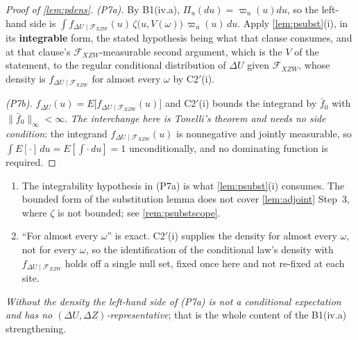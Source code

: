 \begin{proof}[Proof of \cref{lem:pdens}]
\emph{\textup{(P7a)}.} By B1(iv.a), $\Pi_u(du)=\varpi_u(u)du$, so the left-hand side is
$\int f_{\Delta U\mid\mathcal F_{XZW}}(u)\,\zeta\big(u,V(\omega)\big)\,\varpi_u(u)\,du$. Apply
\cref{lem:psubst}(i), in
its \textbf{integrable} form, the stated hypothesis being what that clause consumes, and at that clause's
$\mathcal F_{XZW}$-measurable second argument, which is the $V$ of the statement, to the regular
conditional distribution of $\Delta U$ given $\mathcal F_{XZW}$, whose density is
$f_{\Delta U\mid\mathcal F_{XZW}}$ for almost every $\omega$ by C2$'$(i).

\emph{\textup{(P7b)}.} $f_{\Delta U}(u)=E\big[f_{\Delta U\mid\mathcal F_{XZW}}(u)\big]$ and C2$'$(i)
bounds the integrand by $\bar f_0$ with $\|\bar f_0\|_\infty<\infty$. \emph{The interchange here is
Tonelli's theorem and needs no side condition}: the integrand $f_{\Delta U\mid\mathcal F_{XZW}}(u)$ is
nonnegative and jointly measurable, so $\int E[\cdot]\,du=E[\int\cdot\,du]=1$ unconditionally, and no
dominating function is required.
\end{proof}

\begin{remark}\label{rem:pdensscope}
\begin{enumerate}
\item[$(\alpha)$] The integrability hypothesis in \textup{(P7a)} is what
\cref{lem:psubst}(i) consumes. The bounded form of the substitution lemma does not cover
\cref{lem:adjoint} Step~3, where $\zeta$ is not bounded; see \cref{rem:psubstscope}.
\item[$(\beta)$] ``For almost every $\omega$'' is exact. C2$'$(i) supplies the density for almost
every $\omega$, not for every $\omega$, so the identification of the conditional law's density with
$f_{\Delta U\mid\mathcal F_{XZW}}$ holds off a single null set, fixed once here and not re-fixed at each
site.
\end{enumerate}
\emph{Without the density the left-hand side of \textup{(P7a)} is not a conditional expectation and has no
$(\Delta U,\Delta Z)$-representative}; that is the whole content of the B1(iv.a) strengthening.
\end{remark}

